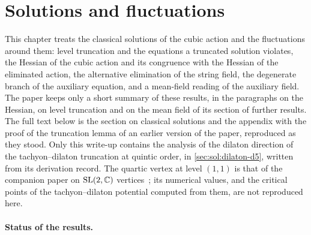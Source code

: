 \section{Solutions and fluctuations}
\label{ch:solutions}

This chapter treats the classical solutions of the cubic action and the fluctuations around them: level truncation and the equations a truncated solution violates, the Hessian of the cubic action and its congruence with the Hessian of the eliminated action, the alternative elimination of the string field, the degenerate branch of the auxiliary equation, and a mean-field reading of the auxiliary field.
The paper keeps only a short summary of these results, in the paragraphs on the Hessian, on level truncation and on the mean field of its section of further results.
The full text below is the section on classical solutions and the appendix with the proof of the truncation lemma of an earlier version of the paper, reproduced as they stood.
Only this write-up contains the analysis of the dilaton direction of the tachyon--dilaton truncation at quintic order, in \cref{sec:sol:dilaton-d5}, written from its derivation record.
The quartic vertex at level $(1, 1)$ is that of the companion paper on $\mathrm{SL}(2, \mathbb{C})$ vertices~\cite{Erbin:2026:SL2CVerticesClosed}; its numerical values, and the critical points of the tachyon--dilaton potential computed from them, are not reproduced here.

\paragraph{Status of the results.}


